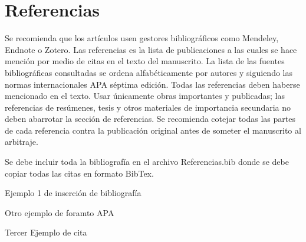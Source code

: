 \documentclass[esp]{CEDAMAZ-class}
\begin{document}
\section{Referencias}

Se recomienda que los artículos usen gestores bibliográficos como Mendeley, Endnote o Zotero.  Las referencias es la lista de publicaciones a las cuales se hace mención por medio de citas en el texto del manuscrito. La lista de las fuentes bibliográficas consultadas se ordena alfabéticamente por autores y siguiendo las normas internacionales APA séptima edición. Todas las referencias deben haberse mencionado en el texto. Usar únicamente obras importantes y publicadas; las referencias de resúmenes, tesis y otros materiales de importancia secundaria no deben abarrotar la sección de referencias. Se recomienda cotejar todas las partes de cada referencia contra la publicación original antes de someter el manuscrito al arbitraje.

Se debe incluir toda la bibliografía en el archivo Referencias.bib donde se debe copiar todas las citas en formato BibTex. 

Ejemplo 1 \citep{Aguirre2014} de inserción de bibliografía 

Otro ejemplo \cite{Alburqueque2015} de foramto APA

Tercer Ejemplo de cita \citeauthor{Chamorro2018}
\balance
{}
\end{document}
